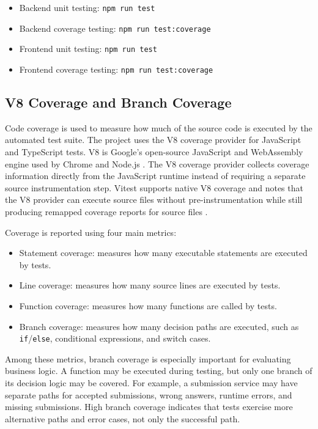 \begin{itemize}
    \item Backend unit testing: \texttt{npm run test}
    \item Backend coverage testing: \texttt{npm run test:coverage}
    \item Frontend unit testing: \texttt{npm run test}
    \item Frontend coverage testing: \texttt{npm run test:coverage}
\end{itemize}

\subsection{V8 Coverage and Branch Coverage}

Code coverage is used to measure how much of the source code is executed by the automated test suite. The project uses the V8 coverage provider for JavaScript and TypeScript tests. V8 is Google's open-source JavaScript and WebAssembly engine used by Chrome and Node.js \cite{v8docs2026}. The V8 coverage provider collects coverage information directly from the JavaScript runtime instead of requiring a separate source instrumentation step. Vitest supports native V8 coverage and notes that the V8 provider can execute source files without pre-instrumentation while still producing remapped coverage reports for source files \cite{vitest_coverage2026}.

Coverage is reported using four main metrics:

\begin{itemize}
    \item Statement coverage: measures how many executable statements are executed by tests.
    \item Line coverage: measures how many source lines are executed by tests.
    \item Function coverage: measures how many functions are called by tests.
    \item Branch coverage: measures how many decision paths are executed, such as \texttt{if}/\texttt{else}, conditional expressions, and switch cases.
\end{itemize}

Among these metrics, branch coverage is especially important for evaluating business logic. A function may be executed during testing, but only one branch of its decision logic may be covered. For example, a submission service may have separate paths for accepted submissions, wrong answers, runtime errors, and missing submissions. High branch coverage indicates that tests exercise more alternative paths and error cases, not only the successful path.

